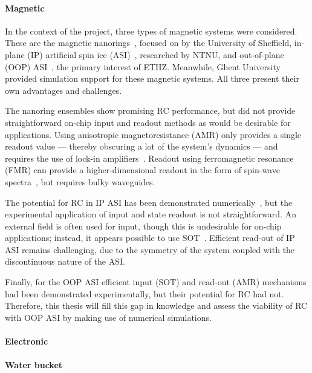 \paragraph{Magnetic} %
In the context of the \spinengine project, three types of magnetic systems were considered.
These are the magnetic nanorings~\cite{DynamicEmergence_NanomagneticSystem}, focused on by the University of Sheffield, in-plane (IP) artificial spin ice (ASI)~\cite{RC_ASI}, researched by NTNU, and out-of-plane (OOP) ASI~\cite{KUR-24}, the primary interest of ETHZ.
Meanwhile, Ghent University provided simulation support for these magnetic systems.
All three present their own advantages and challenges. \par
The nanoring ensembles show promising RC performance, but did not provide straightforward on-chip input and readout methods as would be desirable for applications.
Using anisotropic magnetoresistance (AMR) only provides a single readout value --- thereby obscuring a lot of the system's dynamics --- and requires the use of lock-in amplifiers~\cite{ArchitecturesNanoringRC,Vidamour2023}.
Readout using ferromagnetic resonance (FMR) can provide a higher-dimensional readout in the form of spin-wave spectra~\cite{swindells2024fingerprinting}, but requires bulky waveguides. \par
The potential for RC in IP ASI has been demonstrated numerically~\cite{RC_ASI}, but the experimental application of input and state readout is not straightforward.
An external field is often used for input, though this is undesirable for on-chip applications; instead, it appears possible to use SOT~\cite{SOT_switching_IP}.
Efficient read-out of IP ASI remains challenging, due to the symmetry of the system coupled with the discontinuous nature of the ASI. \par %
Finally, for the OOP ASI efficient input (SOT) and read-out (AMR) mechanisms had been demonstrated experimentally, but their potential for RC had not.
Therefore, this thesis will fill this gap in knowledge and assess the viability of RC with OOP ASI by making use of numerical simulations.
\paragraph{Electronic}
\paragraph{Water bucket}

